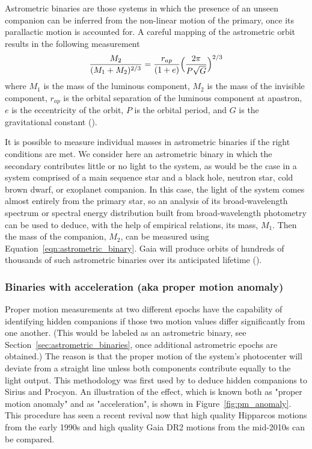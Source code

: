 \documentclass[twocolumn,tighten,twocolappendix]{aastex631}
\begin{document}
Astrometric binaries are those systems in which the presence of an unseen companion can be inferred from the non-linear motion of the primary, once its parallactic motion is accounted for. A careful mapping of the astrometric orbit results in the following measurement
\begin{equation}
\label{eqn:astrometric_binary}
    \frac{M_2}{(M_1 + M_2)^{2/3}} = \frac{r_{ap}}{(1+e)} \Bigl(\frac{2\pi}{P\sqrt{G}}\Bigr)^{2/3} 
\end{equation}
where $M_1$ is the mass of the luminous component, $M_2$ is the mass of the invisible component, $r_{ap}$ is the orbital separation of the luminous component at apastron, $e$ is the eccentricity of the orbit, $P$ is the orbital period, and $G$ is the gravitational constant (\citealt{andrews2019}).

It is possible to measure individual masses in astrometric binaries if the right conditions are met. We consider here an astrometric binary in which the secondary contributes little or no light to the system, as would be the case in a system comprised of a main sequence star and a black hole, neutron star, cold brown dwarf, or exoplanet companion. In this case, the light of the system comes almost entirely from the primary star, so an analysis of its broad-wavelength spectrum or spectral energy distribution built from broad-wavelength photometry can be used to deduce, with the help of empirical relations, its mass, $M_1$. Then the mass of the companion, $M_2$, can be measured using Equation~\ref{eqn:astrometric_binary}. Gaia will produce orbits of hundreds of thousands of such astrometric binaries over its anticipated lifetime (\citealt{halbwachs2023}).

\subsubsection{Binaries with acceleration (aka proper motion anomaly)\label{sec:proper_motion_anomaly}}

Proper motion measurements at two different epochs have the capability of identifying hidden companions if those two motion values differ significantly from one another. (This would be labeled as an astrometric binary, see Section~\ref{sec:astrometric_binaries}, once additional astrometric epochs are obtained.) The reason is that the proper motion of the system's photocenter will deviate from a straight line unless both components contribute equally to the light output. This methodology was first used by \cite{bessel1844} to deduce hidden companions to Sirius and Procyon. An illustration of the effect, which is known both as "proper motion anomaly" and as "acceleration", is shown in Figure~\ref{fig:pm_anomaly}. This procedure has seen a recent revival now that high quality Hipparcos motions from the early 1990s and high quality Gaia DR2 motions from the mid-2010s can be compared.
\end{document}
